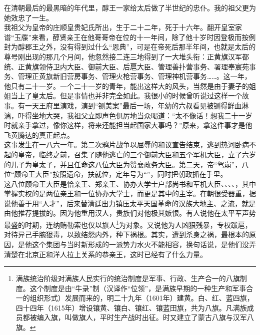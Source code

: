在清朝最后的最黑暗的年代里，醇王一家给太后做了半世纪的忠仆。我的祖父更为她效忠了一生。\\

我祖父为皇帝的庄顺皇贵妃氏所出，生于二十二年，死于十六年。翻开皇室家谱“玉牒”来看，醇贤亲王在他哥哥帝在位的十一年间，除了他十岁时因登极而按例封为醇郡王之外，没有得到过什么“恩典”，可是在帝死后那半年间，也就是太后的尊号刚出现的那几个月间，他忽然接二连三地得到了一大堆头衔：正黄旗汉军都统、正黄旗领侍卫内大臣、御前大臣、后扈大臣、管理善扑营事务、署理奉宸苑事务、管理正黄旗新旧营房事务、管理火枪营事务、管理神机营事务……。这一年，他只有二十一岁。一个二十一岁的青年，能出这样大的风头，当然是由于妻子的姐姐当上了皇太后。但是事情也并非完全如此。我很小的时候曾听说过这样一个故事。有一天王府里演戏，演到“铡美案”最后一场，年幼的六叔看见被铡得鲜血淋漓，吓得坐地大哭，我祖父立即声色俱厉地当众喝道：“太不像话！想我二十一岁时就亲手拿过，像你这样，将来还能担当起国家大事吗？”原来，拿这件事才是他飞黄腾达的真正起点。\\

这事发生在一八六一年。第二次鸦片战争以屈辱的和议宣告结束，逃到热河卧病不起的皇帝，临终之前，召集了随他逃亡的三个御前大臣和五个军机大臣，立了六岁的儿子为皇太子，并且任命这八位大臣为赞襄政务大臣。第二天，帝“驾崩”，八位“顾命王大臣”按照遗命，扶就位，定年号为“”，同时把朝政抓在手里。\\

这八位顾命王大臣是恰亲王、郑亲王、协办大学士户部尚书和军机大臣、、、、，其中掌握实权的是两位亲王和一位协办大学士，而更是其中的主宰。在朝很受器重，据说他善于用“人才”，后来替清廷出力镇压太平天国革命的汉族大地主、之流，就是由他推荐提拔的。因为他重用汉人，贵族们对他极其嫉恨。有人说他在太平军声势最盛的时期，连纳贿勒索也仅以旗人\footnote{满族统治阶级对满族人民实行的统治制度是军事、行政、生产合一的八旗制度。这个制度是由“牛录”制（汉译作“位领”，是满族早期的一种生产和军事合一的组织形式）发展而来的，明二十九年（1601年）建黄。白、红、蓝四旗，四十四年（1615年）增设镶黄、镶白、镶红、镶蓝田旗，共为八旗。凡满族成员都被编入旗，叫做旗人，平时生产战时出征。时又建立了蒙古八旗与汉军八旗。}为对象。又说他为人凶狠残暴，专权跋扈，对待异己手腕狠毒，以致结怨内外，种下祸根。其实，遭到杀身之祸，最根本的原因，是他这个集团与当时新形成的一派势力水火不能相容，换句话说，是他们没弄清楚在北京正和洋人拉上关系的恭亲王，这时已经有了什么力量。\\

